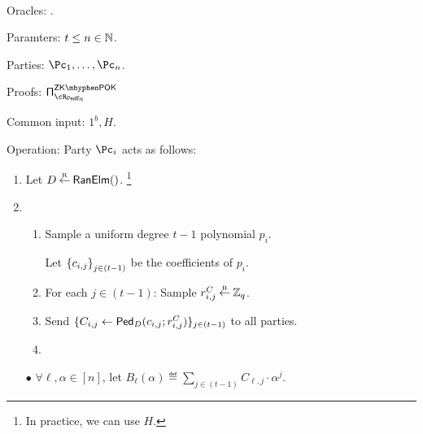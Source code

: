 \begin{protocol}\label{prot:TshEG:KG}~
	
	\item[Oracles:] \randomH.
	\item[Paramters:] $t\le n \in {\mathbb{N}}$.
	
	\item[Parties:] $\Pc_1,\ldots,\Pc_n$.

	
	\item[Proofs:] $\piZKPOK{\rPedEq}$
			
	\item[Common input:]	$1^b,H$.
	
	
	\item[Operation:] Party $\Pc_i$ acts as follows:
	
	
	\begin{enumerate}

       
        \item Let $D\mathbin{\stackrel{\mbox{\tiny R}}{\leftarrow}} \mathsf{RanElm}()$. \footnote{In practice, we can use $H$.}
        
        
    	\item  	{}
    
   
		\begin{enumerate}  
			
			\item Sample  a uniform degree $t-1$ polynomial  $p_i$.   
			
			Let $\set{c_{i,j}}_{j\in (t-1)}$ be the coefficients of  $p_i$. 			
			
			
			
			\item For each $j\in (t-1)$: Sample   $r^C_{i,j} \mathbin{\stackrel{\mbox{\tiny R}}{\leftarrow}}\mathbb{Z}_q$. 
			
			\item Send   $\{C_{i,j} \leftarrow \mathsf{Ped}_D(c_{i,j};r^C_{i,j})\}_{j\in (t-1)}$  to all parties. 
			
			
			\item {}
			
			
			\end{enumerate}
			
			
				\item[$\bullet$]  $\forall \ell,\alpha \in [n]$, let $B_{\ell}(\alpha)  \eqdef   \sum_{j\in (t-1)} C_{\ell,j} \cdot \alpha^j$. 
				

\end{enumerate}
\end{protocol}
